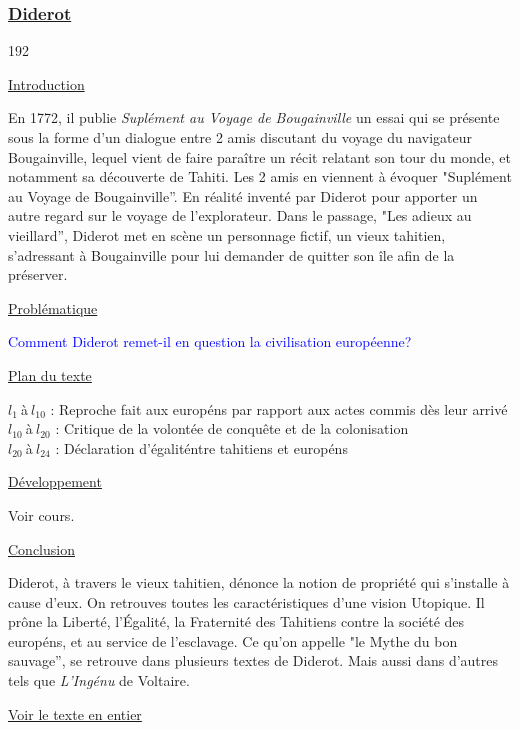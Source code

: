 \documentclass[12pt,a4paper]{article}
\begin{document}
			\subsubsection{\href{.extra/Bio/Diderot.pdf}{Diderot}}
\begin{dingautolist}{192}

\item \underline{Introduction} \par
	En 1772, il publie \textit{Supl\'ement au Voyage de Bougainville} un essai qui se pr\'esente sous la forme d'un dialogue entre 2 amis discutant du voyage du navigateur Bougainville, 
	lequel vient de faire para\^itre un r\'ecit relatant son tour du monde, et notamment sa d\'ecouverte de Tahiti.
	Les 2 amis en viennent \`a \'evoquer "Supl\'ement au Voyage de Bougainville''. En r\'ealit\'e invent\'e par Diderot pour apporter un autre regard sur le voyage de l'explorateur.
	Dans le passage, "Les adieux au vieillard'', Diderot met en sc\`ene un personnage fictif, un vieux tahitien, s'adressant \`a Bougainville pour lui demander de quitter son \^ile afin de la pr\'eserver.

\item \underline{Probl\'ematique }\par
	\textcolor{blue}{Comment Diderot remet-il en question la civilisation europ\'eenne?}

\item \underline{Plan du texte} \par
	$l_{1}~$\`a$~l_{10}$ : Reproche fait aux europ\'ens par rapport aux actes commis d\`es leur arriv\'e\\
	$l_{10}~$\`a$~l_{20}$ : Critique de la volont\'ee de conquête et de la colonisation\\
	$l_{20}~$\`a$~l_{24}$ : D\'eclaration d'\'egalit\' entre tahitiens et europ\'ens 

\item \underline{D\'eveloppement} \par
        Voir cours.

\item \underline{Conclusion} \par
	Diderot, \`a travers le vieux tahitien, d\'enonce la notion de propri\'et\'e qui s'installe \`a cause d'eux.
	On retrouves toutes les caract\'eristiques d'une vision Utopique.
	Il prône la Libert\'e, l'\'Egalit\'e, la Fraternit\'e des Tahitiens contre la soci\'et\'e des europ\'ens, et au service de l'esclavage.
	Ce qu'on appelle "le Mythe du bon sauvage'', se retrouve dans plusieurs textes de Diderot. Mais aussi dans d'autres tels que \textit{L'Ing\'enu} de Voltaire.

\end{dingautolist}
\href{.extra/Textes/Bougainville.pdf}{Voir le texte en entier}
 \newpage
\end{document}
